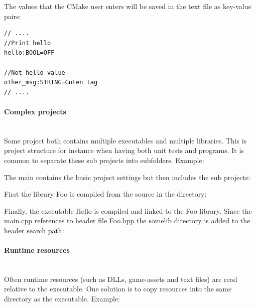 \documentclass[11pt,a4paper,landscape]{scrartcl} %
\newcommand{\sectiontitle}[1]{\paragraph{#1} \ \\} %
\begin{document}
\begin{multicols}{2}
The values that the CMake user enters will be saved in the text file  as key-value pairs:

\begin{lstlisting}[language=bash]
// ....
//Print hello
hello:BOOL=OFF

//Not hello value
other_msg:STRING=Guten tag
// ....
\end{lstlisting}

\sectiontitle{Complex projects}

Some project both contains multiple executables and multiple libraries. This is project structure for instance when having both unit tests and programs. It is common to separate these sub projects into subfolders. Example:

\vspace{\baselineskip} %
\noindent{}

\vspace{\baselineskip} %

The main  contains the basic project settings but then includes the sub projects:



First the library Foo is compiled from the source in the   directory:



Finally, the executable Hello is compiled and linked to the Foo library. Since the main.cpp references to header file Foo.hpp the somelib directory is added to the header search path:



\sectiontitle{Runtime resources}

Often runtime resources (such as DLLs, game-assets and text files) are read relative to the executable. One solution is to copy resources into the same directory as the executable. Example:

\vspace{\baselineskip} %
\noindent{}


\end{multicols}
\end{document}
